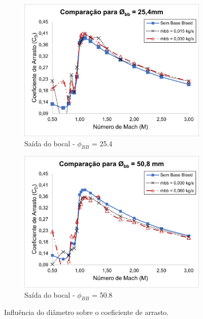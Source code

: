 \begin{figure}[!ht]
	\centering
	\begin{subfigure}[b]{0.47\textwidth}
    	\centering
    	\includegraphics[width=\textwidth]{cd-combasebleed-diametro-1pol.png}
    	\caption{Saída do bocal - \(\phi_{BB}\) = \qty{25,4}{\millimetre}}
    	\label{fig:comparacao-bb-diametro-1pol}
    \end{subfigure}
    \hfill
	\begin{subfigure}[b]{0.47\textwidth}
    	\centering
    	\includegraphics[width=\textwidth]{cd-combasebleed-diametro-2pol.png}
    	\caption{Saída do bocal - \(\phi_{BB}\) = \qty{50,8}{\millimetre}}
    	\label{fig:comparacao-bb-diametro-2pol}
    \end{subfigure}
	\caption{Influência do diâmetro sobre o coeficiente de arrasto.}
	\label{fig:comparacao-bb-diametro-vazoes}
\end{figure}

